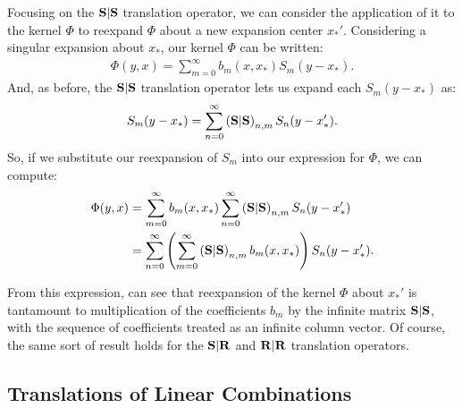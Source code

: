 Focusing on the $\bold{S}|\bold{S}$
translation operator, we can consider the application of it to the
kernel $\Phi$
to reexpand $\Phi$
about a new expansion center $x_*'$.
Considering a singular expansion about $x_*$,
our kernel $\Phi$ can be written:
\begin{align*}
  \Phi(y, x) = \sum_{m=0}^\infty b_m(x, x_*) S_m(y - x_*).
\end{align*}
And, as before, the $\bold{S}|\bold{S}$
translation operator lets us expand each $S_m(y - x_*)$ as:
\begin{align*}
  S_m(y - x_*) = \sum_{n=0}^\infty \left(\bold{S}|\bold{S}\right)_{n,m} S_n(y - x_*').
\end{align*}
So, if we substitute our reexpansion of $S_m$
into our expression for $\Phi$, we can compute:
\begin{align*}
  \Phi(y, x)
  &= \sum_{m=0}^\infty b_m(x, x_*) \sum_{n=0}^\infty \left(\bold{S}|\bold{S}\right)_{n,m} S_n(y - x_*') \\
  &= \sum_{n=0}^\infty \left(\sum_{m=0}^\infty \left(\bold{S}|\bold{S}\right)_{n,m} b_m(x, x_*)\right) S_n(y - x_*').
\end{align*}

From this expression, can see that reexpansion of the kernel $\Phi$
about $x_*'$ is tantamount to multiplication of the coefficients $b_m$
by the infinite matrix $\bold{S}|\bold{S}$, with the sequence of coefficients
treated as an infinite column vector. Of course, the same sort of
result holds for the $\bold{S}|\bold{R}$ and $\bold{R}|\bold{R}$ translation operators.

\subsection{Translations of Linear Combinations}

